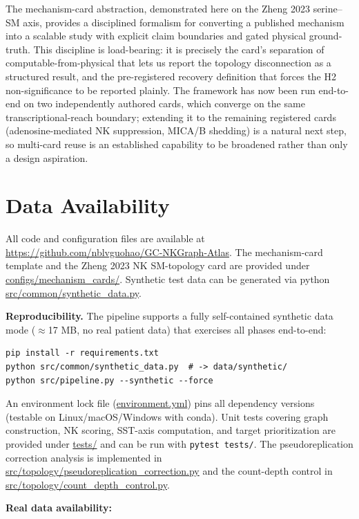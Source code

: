 \documentclass[modern,large,numbered,nocrop]{oup-authoring-template}
\begin{document}
The mechanism-card abstraction, demonstrated here on the Zheng 2023 serine--SM axis, provides a disciplined formalism for converting a published mechanism into a scalable study with explicit claim boundaries and gated physical ground-truth. This discipline is load-bearing: it is precisely the card's separation of computable-from-physical that lets us report the topology disconnection as a structured result, and the pre-registered recovery definition that forces the H2 non-significance to be reported plainly. The framework has now been run end-to-end on two independently authored cards, which converge on the same transcriptional-reach boundary; extending it to the remaining registered cards (adenosine-mediated NK suppression, MICA/B shedding) is a natural next step, so multi-card reuse is an established capability to be broadened rather than only a design aspiration.

\section*{Data Availability}

All code and configuration files are available at \url{https://github.com/nblvguohao/GC-NKGraph-Atlas}. The mechanism-card template and the Zheng 2023 NK SM-topology card are provided under \url{configs/mechanism_cards/}. Synthetic test data can be generated via python \url{src/common/synthetic_data.py}.

\textbf{Reproducibility.} The pipeline supports a fully self-contained synthetic data mode ($\approx$17 MB, no real patient data) that exercises all phases end-to-end:
\begin{verbatim}
pip install -r requirements.txt
python src/common/synthetic_data.py  # -> data/synthetic/
python src/pipeline.py --synthetic --force
\end{verbatim}
An environment lock file (\url{environment.yml}) pins all dependency versions (testable on Linux/macOS/Windows with conda). Unit tests covering graph construction, NK scoring, SST-axis computation, and target prioritization are provided under \url{tests/} and can be run with \texttt{pytest tests/}. The pseudoreplication correction analysis is implemented in \url{src/topology/pseudoreplication_correction.py} and the count-depth control in \url{src/topology/count_depth_control.py}.

\textbf{Real data availability:}
\end{document}

